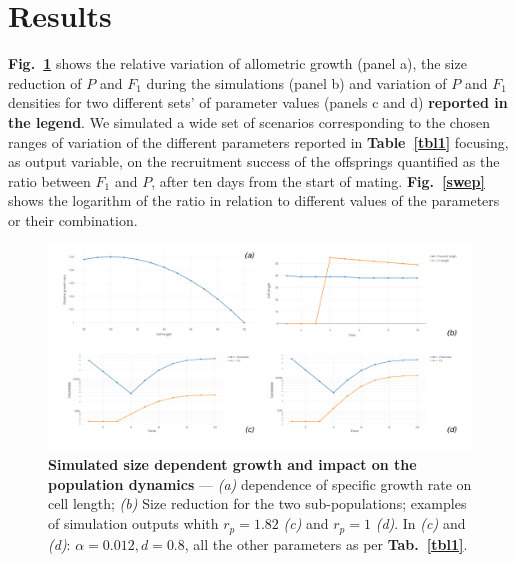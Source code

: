 \documentclass[a4paper,oneside]{article}
\begin{document}
  \section*{Results}
    \textbf{Fig.~\ref{fdyn}} shows the relative variation of allometric growth (panel a), the size reduction of $P$ and $F_{1}$ during the simulations (panel b) and variation of $P$ and $F_{1}$ densities for two different sets' of parameter values (panels c and d) \textbf{reported in the legend}.
    We simulated a wide set of scenarios corresponding to the chosen ranges of variation of the different parameters reported in \textbf{Table~\ref{tbl1}} focusing, as output variable, on the recruitment success of the offsprings quantified as the ratio between $F_{1}$ and $P$, after ten days from the start of mating.
    \textbf{Fig.~\ref{swep}} shows the logarithm of the ratio in relation to different values of the parameters or their combination.
    \begin{figure}[p]
      \includegraphics[width=\linewidth]{imgs/Figpan.pdf}
      \caption{\textbf{Simulated size dependent growth and impact on the population dynamics} ---
      \textit{(a)} dependence of specific growth rate on cell length;
      \textit{(b)} Size reduction for the two sub-populations;
      examples of simulation outputs whith $r_{p} = 1.82$ \textit{(c)} and $r_{p} = 1$ \textit{(d)}.
      In \textit{(c)} and \textit{(d)}: $\alpha=0.012, d = 0.8$, all the other parameters as per \textbf{Tab.~\ref{tbl1}}.}\label{fdyn}
    \end{figure}
\end{document}
